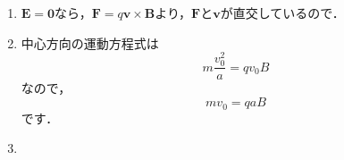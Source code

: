 \documentclass[a4paper,pdflatex,ja=standard]{bxjsarticle}
\begin{document}
\begin{enumerate}
  
  \item 

  $\bm{E}=\bm{0}$なら，$\bm{F}=q\bm{v}\times\bm{B}$より，$\bm{F}$と$\bm{v}$が直交しているので．


  \item 

  中心方向の運動方程式は
  \begin{equation}
    m\frac{v_0^2}{a}
    =
    qv_0 B
  \end{equation}
  なので，
  \begin{equation}
    mv_0
    =
    qaB
  \end{equation}
  です．


  \item 


\end{enumerate}
\end{document}
